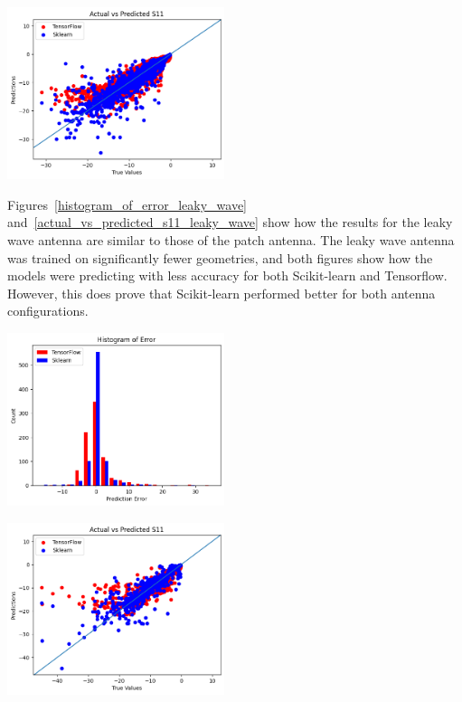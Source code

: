 \documentclass[lettersize,journal]{IEEEtran}
\newenvironment{Figure}
    {\par\medskip\noindent\minipage{\linewidth}}
    {\endminipage\par\medskip}
\begin{document}
\begin{Figure}
    \centering
    \includegraphics[width=2.5in]{actual_vs_predicted_s11_patch}
    \label{actual_vs_predicted_s11_patch}
\end{Figure}

Figures~\ref{histogram_of_error_leaky_wave} and~\ref{actual_vs_predicted_s11_leaky_wave} show how the results for the leaky wave antenna are similar to those of the patch antenna. The leaky wave antenna was trained on significantly fewer geometries, and both figures show how the models were predicting with less accuracy for both Scikit-learn and Tensorflow. However, this does prove that Scikit-learn performed better for both antenna configurations.

\begin{Figure}
    \centering
    \includegraphics[width=2.5in]{histogram_leaky_wave}
    \label{histogram_of_error_leaky_wave}
\end{Figure}

\begin{Figure}
    \centering
    \includegraphics[width=2.5in]{actual_vs_predicted_s11_leaky_wave}
    \label{actual_vs_predicted_s11_leaky_wave}
\end{Figure}
\end{document}
